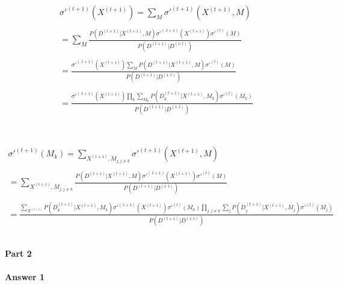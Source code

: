 \documentclass[12pt]{article}
\begin{document}
\[\begin{array}{l}
 \sigma {'^{(t + 1)}}({X^{(t + 1)}}) = \sum\nolimits_M {\sigma {'^{(t + 1)}}({X^{(t + 1)}},M)}  \\ \\
  = \sum\limits_M {\frac{{P({D^{(t + 1)}}|{X^{(t + 1)}},M)\sigma {'^{(.t + 1)}}({X^{(t + 1)}})\sigma {'^{(t)}}(M)}}{{P({D^{(t + 1)}}|{D^{(1:t)}})}}}  \\ \\
  = \frac{{\sigma {'^{(.t + 1)}}({X^{(t + 1)}})\sum\limits_M {P({D^{(t + 1)}}|{X^{(t + 1)}},M)\sigma {'^{(t)}}(M)} }}{{P({D^{(t + 1)}}|{D^{(1:t)}})}} \\ \\
  = \frac{{\sigma {'^{(.t + 1)}}({X^{(t + 1)}})\prod\limits_k {\sum\limits_{{M_k}} {P({D^{(t + 1)}_{k}}|{X^{(t + 1)}},{M_k})\sigma {'^{(t)}}({M_k})} } }}{{P({D^{(t + 1)}}|{D^{(1:t)}})}} \\ 
 \end{array}\]
 \\
 \\
 
 \[\begin{array}{l}
 \sigma {'^{(t + 1)}}({M_k}) = \sum\nolimits_{{X^{(t + 1)}},{M_{j,j \ne k}}} {\sigma {'^{(t + 1)}}({X^{(t + 1)}},M)}  \\ \\
  = \sum\limits_{{X^{(t + 1)}},{M_{j,j \ne k}}} {\frac{{P({D^{(t + 1)}}|{X^{(t + 1)}},M)\sigma {'^{(.t + 1)}}({X^{(t + 1)}})\sigma {'^{(t)}}(M)}}{{P({D^{(t + 1)}}|{D^{(1:t)}})}}}  \\ \\
  = \frac{{\sum\limits_{{X^{(t + 1)}}} {P({D^{(t + 1)}_{k}}|{X^{(t + 1)}},{M_k})\sigma {'^{(.t + 1)}}({X^{(t + 1)}})} \sigma {'^{(t)}}({M_k})\prod\limits_{j,j \ne k} {\sum\limits_j {P({D^{(t + 1)}_{j}}|{X^{(t + 1)}},{M_j})\sigma {'^{(t)}}({M_j})} } }}{{P({D^{(t + 1)}}|{D^{(1:t)}})}} \\ \\
 \end{array}\]

\newpage
\begin{center}
\paragraph{Part 2}
\end{center}

\paragraph{Answer 1}  
\end{document}
